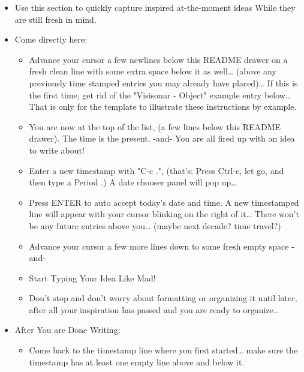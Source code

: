 \documentclass[11pt]{article}
\begin{document}
\begin{itemize}
\item Use this section to quickly capture inspired at-the-moment ideas While they are still fresh in mind.

\item Come directly here:

\begin{itemize}
\item Advance your cursor a few newlines below this README drawer on a fresh clean line with some extra space below it as well\ldots{} (above any previously time stamped entries you may already have placed)\ldots{} If this is the first time, get rid of the "Visisonar - Object" example entry below\ldots{} That is only for the template to illustrate these instructions by example.

\item You are now at the top of the list, (a few lines below this README drawer). The time is the present. -and- You are all fired up with an idea to write about!

\item Enter a new timestamp with "C-c .", (that's: Press Ctrl-c, let go, and then type a Period .)  A date chooser panel will pop up\ldots{}

\item Press ENTER to auto accept today's date and time.  A new timestamped line will appear with your cursor blinking on the right of it\ldots{} There won't be any future entries above you\ldots{} (maybe next decade? time travel?)

\item Advance your cursor a few more lines down to some fresh empty space -and-

\item Start Typing Your Idea Like Mad!

\item Don't stop and don't worry about formatting or organizing it until later, after all your inspiration has passed and you are ready to organize\ldots{}
\end{itemize}

\item After You are Done Writing:

\begin{itemize}
\item Come back to the timestamp line where you first started\ldots{} make sure the timestamp has at least one empty line above and below it.


\end{itemize}
\end{itemize}
\end{document}
